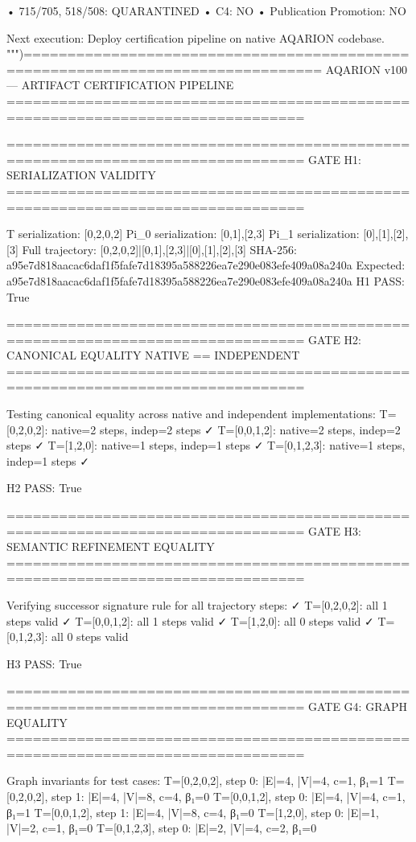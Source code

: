   • 715/705, 518/508: QUARANTINED
  • C4: NO
  • Publication Promotion: NO

Next execution: Deploy certification pipeline on native AQARION codebase.
""")================================================================================
AQARION v100 — ARTIFACT CERTIFICATION PIPELINE
================================================================================

================================================================================
GATE H1: SERIALIZATION VALIDITY
================================================================================

  T serialization: [0,2,0,2]
  Pi_0 serialization: {[0,1],[2,3]}
  Pi_1 serialization: {[0],[1],[2],[3]}
  Full trajectory: [0,2,0,2]|{[0,1],[2,3]}|{[0],[1],[2],[3]}
  SHA-256: a95e7d818aacac6daf1f5fafe7d18395a588226ea7e290e083efe409a08a240a
  Expected:  a95e7d818aacac6daf1f5fafe7d18395a588226ea7e290e083efe409a08a240a
  H1 PASS: True

================================================================================
GATE H2: CANONICAL EQUALITY NATIVE == INDEPENDENT
================================================================================

  Testing canonical equality across native and independent implementations:
    T=[0,2,0,2]: native=2 steps, indep=2 steps ✓
    T=[0,0,1,2]: native=2 steps, indep=2 steps ✓
    T=[1,2,0]: native=1 steps, indep=1 steps ✓
    T=[0,1,2,3]: native=1 steps, indep=1 steps ✓

  H2 PASS: True

================================================================================
GATE H3: SEMANTIC REFINEMENT EQUALITY
================================================================================

  Verifying successor signature rule for all trajectory steps:
    ✓ T=[0,2,0,2]: all 1 steps valid
    ✓ T=[0,0,1,2]: all 1 steps valid
    ✓ T=[1,2,0]: all 0 steps valid
    ✓ T=[0,1,2,3]: all 0 steps valid

  H3 PASS: True

================================================================================
GATE G4: GRAPH EQUALITY
================================================================================

  Graph invariants for test cases:
    T=[0,2,0,2], step 0: |E|=4, |V|=4, c=1, β₁=1
    T=[0,2,0,2], step 1: |E|=4, |V|=8, c=4, β₁=0
    T=[0,0,1,2], step 0: |E|=4, |V|=4, c=1, β₁=1
    T=[0,0,1,2], step 1: |E|=4, |V|=8, c=4, β₁=0
    T=[1,2,0], step 0: |E|=1, |V|=2, c=1, β₁=0
    T=[0,1,2,3], step 0: |E|=2, |V|=4, c=2, β₁=0

